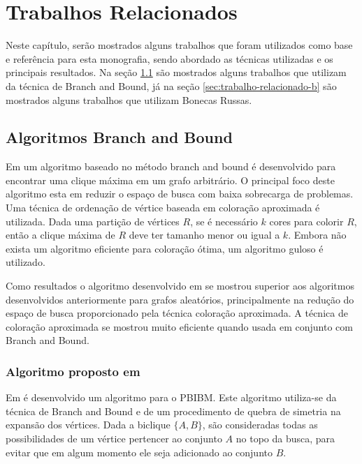 \chapter{Trabalhos Relacionados}
\label{cap:trabalhos-relacionados}

Neste capítulo, serão mostrados alguns trabalhos que foram utilizados como base e referência para esta monografia, sendo abordado as técnicas utilizadas e os principais resultados. Na seção \ref{sec:trabalho-relacionado-a} são mostrados alguns trabalhos que utilizam da técnica de Branch and Bound, já na seção \ref{sec:trabalho-relacionado-b} são mostrados alguns trabalhos que utilizam Bonecas Russas.

\section{Algoritmos Branch and Bound}
\label{sec:trabalho-relacionado-a}

Em  um algoritmo baseado no método branch and bound é 
desenvolvido para encontrar uma clique máxima em um grafo arbitrário. O principal foco deste algoritmo esta em reduzir o espaço de busca com baixa sobrecarga de problemas. Uma técnica de  ordenação de vértice baseada em coloração aproximada é utilizada. Dada uma partição de vértices $R$, se é necessário $k$ cores para colorir $R$, então a clique máxima de $R$ deve ter tamanho menor ou igual a $k$. Embora não exista um algoritmo eficiente para coloração ótima, um algoritmo guloso é utilizado.

Como resultados o algoritmo desenvolvido em   se mostrou superior aos algoritmos desenvolvidos anteriormente para grafos aleatórios, principalmente na redução do espaço de busca proporcionado pela técnica coloração aproximada. A técnica de coloração aproximada se mostrou muito eficiente quando usada em conjunto com Branch and Bound.

\subsection{Algoritmo proposto em \label{sec:proposta1}}

Em  é desenvolvido um algoritmo para o  \acrshort{PBIBM}. Este
algoritmo utiliza-se da técnica de Branch and Bound e de um procedimento de quebra de simetria na expansão dos vértices. Dada a biclique $\{A,B\}$, são consideradas todas as possibilidades de um vértice pertencer ao conjunto $A$ no topo da busca, para evitar que em algum momento ele seja adicionado ao conjunto $B$.

